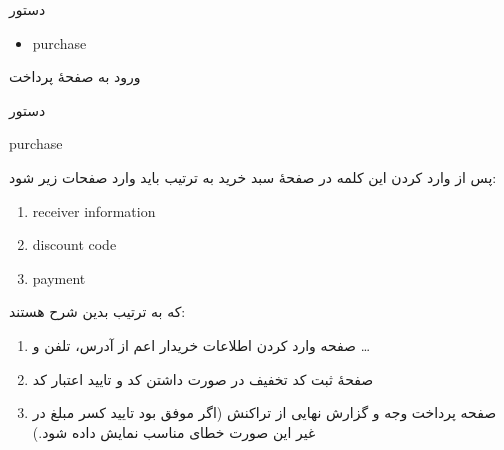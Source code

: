 \documentclass[]{article}
\begin{document}
\begin{mybox}[colback=brilliantlavender]{دستور}

\begin{latin}

\begin{itemize}[label = {$\Rightarrow$}]

\item
purchase

\end{itemize}

\end{latin}

\end{mybox}

ورود به صفحهٔ پرداخت

\hrulefill

\begin{mybox}[colback=yellow]{دستور}

\begin{latin}

purchase

\end{latin}

\end{mybox}

پس از وارد کردن این کلمه در صفحهٔ سبد خرید به ترتیب باید وارد صفحات زیر شود:


\begin{latin}

\begin{enumerate}

\item
receiver information

\item
discount code

\item
payment


\end{enumerate}


\end{latin}

که به ترتیب بدین شرح هستند:

\begin{enumerate}

\item
صفحه وارد کردن اطلاعات خریدار اعم از آدرس، تلفن و …

\item
صفحهٔ ثبت کد تخفیف در صورت داشتن کد و تایید اعتبار کد

\item
صفحه پرداخت وجه و گزارش نهایی از تراکنش‌ (اگر موفق بود تایید کسر مبلغ در غیر این صورت خطای مناسب نمایش داده‌ شود.)


\end{enumerate}
\end{document}
